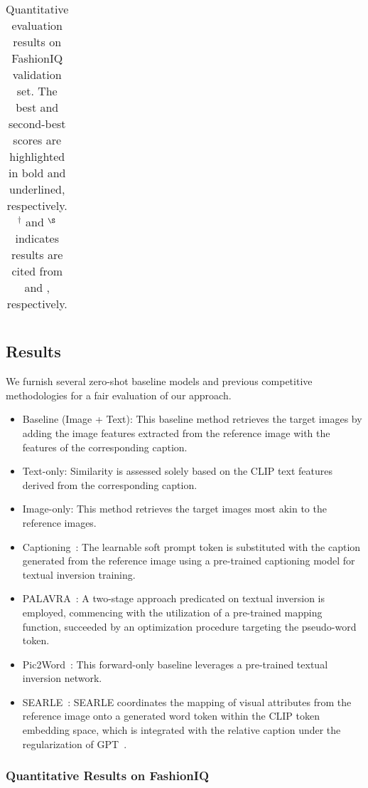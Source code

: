 \documentclass[10pt,twocolumn,letterpaper]{article}
\begin{document}
\begin{table*}[t]
{\begin{tabular}{clcccccccc}
\bottomrule
  \end{tabular}}
  \caption{Quantitative evaluation results on FashionIQ validation set. The best and second-best scores are highlighted in bold and underlined, respectively. $^{\dagger}$ and $^\S$ indicates results are cited from \cite{Baldrati_2023_ICCV} and \cite{saito2023pic2word}, respectively.}
  \label{tab:fashioniq_val}
\end{table*}
\subsection{Results}
We furnish several zero-shot baseline models and previous competitive methodologies for a fair evaluation of our approach.

\begin{itemize}
    \item Baseline (Image + Text): This baseline method retrieves the target images by adding the image features extracted from the reference image with the features of the corresponding caption.
    \item Text-only: Similarity is assessed solely based on the CLIP text features derived from the corresponding caption.
    \item Image-only: This method retrieves the target images most akin to the reference images.
    \item Captioning~\cite{Baldrati_2023_ICCV}: The learnable soft prompt token is substituted with the caption generated from the reference image using a pre-trained captioning model for textual inversion training.
    \item PALAVRA~\cite{cohen2022my}: A two-stage approach predicated on textual inversion is employed, commencing with the utilization of a pre-trained mapping function, succeeded by an optimization procedure targeting the pseudo-word token.
    \item Pic2Word~\cite{saito2023pic2word}: This forward-only baseline leverages a pre-trained textual inversion network.
    \item SEARLE~\cite{Baldrati_2023_ICCV}: SEARLE coordinates the mapping of visual attributes from the reference image onto a generated word token within the CLIP token embedding space, which is integrated with the relative caption under the regularization of GPT~\cite{brown2020language}.
\end{itemize}



\subsubsection{Quantitative Results on FashionIQ}
\end{document}
